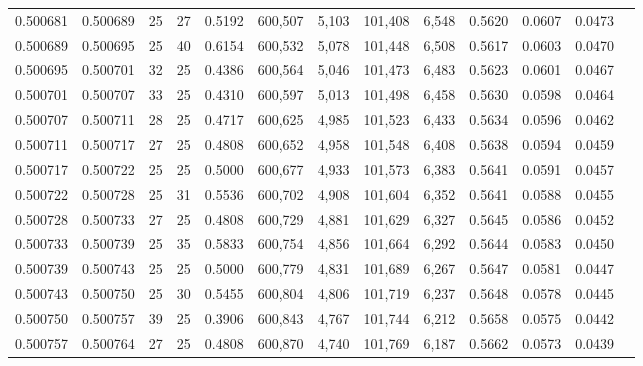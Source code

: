 \begin{tabular}{rrrrrrrrrrrrr}
0.500681 & 0.500689 &    25 &  27 &                                     0.5192 & 600,507 &   5,103 & 101,408 &   6,548 & 0.5620 & 0.0607 & 0.0473 \\
0.500689 & 0.500695 &    25 &  40 &                                     0.6154 & 600,532 &   5,078 & 101,448 &   6,508 & 0.5617 & 0.0603 & 0.0470 \\
0.500695 & 0.500701 &    32 &  25 &                                     0.4386 & 600,564 &   5,046 & 101,473 &   6,483 & 0.5623 & 0.0601 & 0.0467 \\
0.500701 & 0.500707 &    33 &  25 &                                     0.4310 & 600,597 &   5,013 & 101,498 &   6,458 & 0.5630 & 0.0598 & 0.0464 \\
0.500707 & 0.500711 &    28 &  25 &                                     0.4717 & 600,625 &   4,985 & 101,523 &   6,433 & 0.5634 & 0.0596 & 0.0462 \\
0.500711 & 0.500717 &    27 &  25 &                                     0.4808 & 600,652 &   4,958 & 101,548 &   6,408 & 0.5638 & 0.0594 & 0.0459 \\
0.500717 & 0.500722 &    25 &  25 &                                     0.5000 & 600,677 &   4,933 & 101,573 &   6,383 & 0.5641 & 0.0591 & 0.0457 \\
0.500722 & 0.500728 &    25 &  31 &                                     0.5536 & 600,702 &   4,908 & 101,604 &   6,352 & 0.5641 & 0.0588 & 0.0455 \\
0.500728 & 0.500733 &    27 &  25 &                                     0.4808 & 600,729 &   4,881 & 101,629 &   6,327 & 0.5645 & 0.0586 & 0.0452 \\
0.500733 & 0.500739 &    25 &  35 &                                     0.5833 & 600,754 &   4,856 & 101,664 &   6,292 & 0.5644 & 0.0583 & 0.0450 \\
0.500739 & 0.500743 &    25 &  25 &                                     0.5000 & 600,779 &   4,831 & 101,689 &   6,267 & 0.5647 & 0.0581 & 0.0447 \\
0.500743 & 0.500750 &    25 &  30 &                                     0.5455 & 600,804 &   4,806 & 101,719 &   6,237 & 0.5648 & 0.0578 & 0.0445 \\
0.500750 & 0.500757 &    39 &  25 &                                     0.3906 & 600,843 &   4,767 & 101,744 &   6,212 & 0.5658 & 0.0575 & 0.0442 \\
0.500757 & 0.500764 &    27 &  25 &                                     0.4808 & 600,870 &   4,740 & 101,769 &   6,187 & 0.5662 & 0.0573 & 0.0439 \\

\end{tabular}
